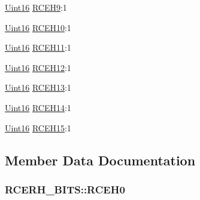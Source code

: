\begin{DoxyCompactItemize}
\item 
\hyperlink{_d_s_p2833x___device_8h_a59a9f6be4562c327cbfb4f7e8e18f08b}{Uint16} \hyperlink{struct_r_c_e_r_h___b_i_t_s_a3d5c1ce77c029d319313110449e90cc4}{R\+C\+E\+H9}\+:1
\item 
\hyperlink{_d_s_p2833x___device_8h_a59a9f6be4562c327cbfb4f7e8e18f08b}{Uint16} \hyperlink{struct_r_c_e_r_h___b_i_t_s_a2d2771a0c230a8153cfe1a74213d2901}{R\+C\+E\+H10}\+:1
\item 
\hyperlink{_d_s_p2833x___device_8h_a59a9f6be4562c327cbfb4f7e8e18f08b}{Uint16} \hyperlink{struct_r_c_e_r_h___b_i_t_s_a44caf669097884caf8a9be79211357aa}{R\+C\+E\+H11}\+:1
\item 
\hyperlink{_d_s_p2833x___device_8h_a59a9f6be4562c327cbfb4f7e8e18f08b}{Uint16} \hyperlink{struct_r_c_e_r_h___b_i_t_s_afe6ed08f069fe2b53ef4aedfc42bb289}{R\+C\+E\+H12}\+:1
\item 
\hyperlink{_d_s_p2833x___device_8h_a59a9f6be4562c327cbfb4f7e8e18f08b}{Uint16} \hyperlink{struct_r_c_e_r_h___b_i_t_s_abe57853ead18c8176014b4367df577d5}{R\+C\+E\+H13}\+:1
\item 
\hyperlink{_d_s_p2833x___device_8h_a59a9f6be4562c327cbfb4f7e8e18f08b}{Uint16} \hyperlink{struct_r_c_e_r_h___b_i_t_s_a18e323719b42919277a03678ff3d3f3b}{R\+C\+E\+H14}\+:1
\item 
\hyperlink{_d_s_p2833x___device_8h_a59a9f6be4562c327cbfb4f7e8e18f08b}{Uint16} \hyperlink{struct_r_c_e_r_h___b_i_t_s_aa5a21fb55e88ff6218881e1e3df27469}{R\+C\+E\+H15}\+:1
\end{DoxyCompactItemize}


\subsection{Member Data Documentation}
\hypertarget{struct_r_c_e_r_h___b_i_t_s_a8e7d25667c992f5e033bb24d4617c118}{}
\subsubsection[{R\+C\+E\+H0}]{ R\+C\+E\+R\+H\+\_\+\+B\+I\+T\+S\+::\+R\+C\+E\+H0}\label{struct_r_c_e_r_h___b_i_t_s_a8e7d25667c992f5e033bb24d4617c118}
\hypertarget{struct_r_c_e_r_h___b_i_t_s_a6073c89d88b5a9a7045b9bd0b7ea9f48}{}
